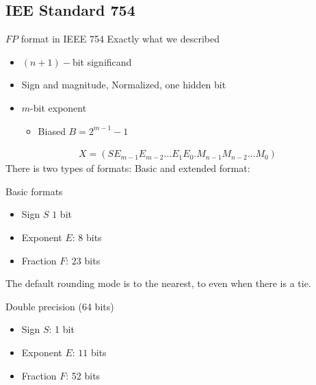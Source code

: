     \subsection{IEE Standard 754}
        \begin{parag}{$FP$ format in IEEE 754}
            Exactly what we described
            \begin{itemize}
                \item $(n+1)-$bit significand
                    \item Sign and magnitude, Normalized, one hidden bit
                    \item $m$-bit exponent 
                        \begin{itemize}
                            \item Biased $B = 2^{m-1} - 1$
                        \end{itemize}
            \end{itemize}
            \begin{align*}
                X = (SE_{m-1}E_{m-2} \dots E_1E_0 . M_{n-1}M_{n-2} \dots M_0)
            \end{align*}
    There is two types of formats: Basic and extended format:
    \begin{subparag}{Basic formats}
        \begin{itemize}
            \item Sign $S$ $1$ bit
            \item Exponent $E$: $8$ bits
            \item Fraction $F$: $23$ bits
        \end{itemize}
        The default rounding mode is to the nearest, to even when there is a tie.
    \end{subparag}
    \begin{subparag}{Double precision (64 bits)}
        \begin{itemize}
            \item Sign $S$: 1 bit
            \item Exponent $E$: $11$ bits
            \item Fraction $F$: 52 bits
        \end{itemize}
        
        
    \end{subparag}
        \end{parag}
        
